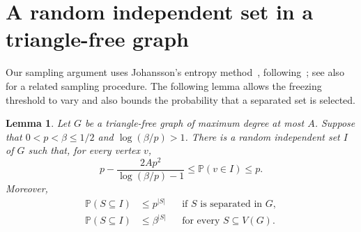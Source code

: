 \documentclass[11pt]{article}
\numberwithin{equation}{section}
\newtheorem{lemma}[theorem]{Lemma}
\theoremstyle{remark}
\newcommand{\Pp}{\mathbb P}
\begin{document}
\section{A random independent set in a triangle-free graph}\label{sec:sampling}

Our sampling argument uses Johansson's entropy method~\cite{Johansson}, following~\cite[Section~2]{Dhawan}; see also~\cite[Section~4]{MS} for a related sampling procedure. The following lemma allows the freezing threshold to vary and also bounds the probability that a separated set is selected.

\begin{lemma}\label{lem:sampling}
Let $G$ be a triangle-free graph of maximum degree at most $A$. Suppose that $0<p<\beta\le1/2$ and $\log(\beta/p)>1$. There is a random independent set $I$ of $G$ such that, for every vertex $v$,
\begin{equation}\label{eq:marginal}
 p-\frac{2Ap^2}{\log(\beta/p)-1}
 \le\Pp(v\in I)\le p.
\end{equation}
Moreover,
\begin{align}
 \Pp(S\subseteq I)&\le p^{|S|}
 &&\text{if $S$ is separated in $G$},\label{eq:separated}\\
 \Pp(S\subseteq I)&\le\beta^{|S|}
 &&\text{for every }S\subseteq V(G).\label{eq:cap}
\end{align}
\end{lemma}
\end{document}
